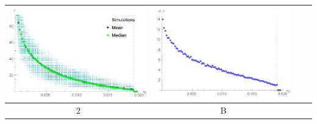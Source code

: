 \begin{table}[!htb]
\begin{tabular}{c|c|c|c}
\begin{minipage}{.4\textwidth}
			\includegraphics[width=\linewidth]{StopTime/1_COMtau.pdf}
		\end{minipage}
		& \begin{minipage}{.4\textwidth}
			\includegraphics[width=\linewidth]{StopTime/1_COMsd.pdf}
		\end{minipage} 
	 \\ \hline
		2 & B & 
			\begin{minipage}{.4\textwidth}
			\includegraphics[width=\linewidth]

\end{minipage}
\end{tabular}
\end{table}
